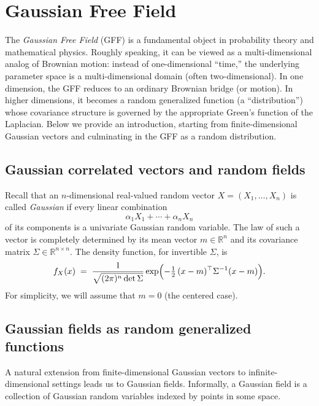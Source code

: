 \documentclass[letterpaper,11pt,oneside,reqno]{article}
\numberwithin{equation}{section}
\theoremstyle{definition}
\begin{document}
\section{Gaussian Free Field}
\label{sec:GFF}

The \emph{Gaussian Free Field} (GFF) is a fundamental object in probability theory and mathematical physics. Roughly speaking, it can be viewed as a multi-dimensional analog of Brownian motion: instead of one-dimensional “time,” the underlying parameter space is a multi-dimensional domain (often two-dimensional). In one dimension, the GFF reduces to an ordinary Brownian bridge (or motion). In higher dimensions, it becomes a random generalized function (a “distribution”) whose covariance structure is governed by the appropriate Green's function of the Laplacian. Below we provide an introduction, starting from finite-dimensional Gaussian vectors and culminating in the GFF as a random distribution.

\subsection{Gaussian correlated vectors and random fields}
\label{subsec:gauss_vectors_random_fields}

Recall that an $n$-dimensional real-valued random vector $X = (X_1,\dots, X_n)$ is called \emph{Gaussian} if every linear combination
\[
\alpha_1 X_1 + \cdots + \alpha_n X_n
\]
of its components is a univariate Gaussian random variable. The law of such a vector is completely determined by its mean vector $m \in \mathbb{R}^n$ and its covariance matrix $\Sigma \in \mathbb{R}^{n\times n}$. The density function, for invertible $\Sigma$, is
\[
f_{X}(x) \;=\; \frac{1}{\sqrt{(2\pi)^n \det \Sigma}}
\exp\Bigl(-\tfrac{1}{2}\,(x - m)^\top \Sigma^{-1}(x - m)\Bigr).
\]
For simplicity, we will assume that $m = 0$ (the centered case).

\subsection{Gaussian fields as random generalized functions}

A natural extension from finite-dimensional Gaussian vectors to infinite-dimensional settings leads us to Gaussian fields. Informally, a Gaussian field is a collection of Gaussian random variables indexed by points in some space.
\end{document}
